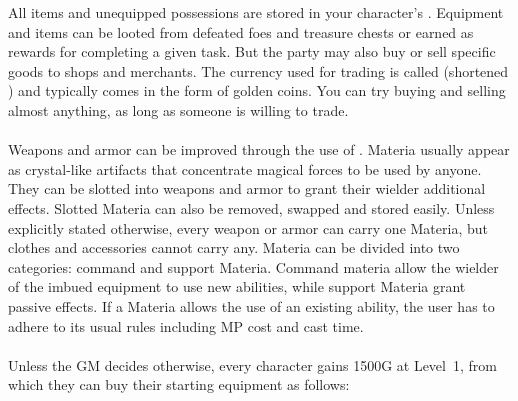 %
\vfill
%
All items and unequipped possessions are stored in your character's .
Equipment and items can be looted from defeated foes and treasure chests or earned as rewards for completing a given task. 
But the party may also buy or sell specific goods to shops and merchants. 
The currency used for trading is called  (shortened ) and typically comes in the form of golden coins.
You can try buying and selling almost anything, as long as someone is willing to trade.
%
\newpage
%
%
\vfill
%
\\\\
%
Weapons and armor can be improved through the use of .
Materia usually appear as crystal-like artifacts that concentrate magical forces to be used by anyone.
They can be slotted into weapons and armor to grant their wielder additional effects.
Slotted Materia can also be removed, swapped and stored easily. 
Unless explicitly stated otherwise, every weapon or armor can carry one Materia, but clothes and accessories cannot carry any.
Materia can be divided into two categories: command and support Materia.
Command materia allow the wielder of the imbued equipment to use new abilities, while support Materia grant passive effects.
If a Materia allows the use of an existing ability, the user has to adhere to its usual rules including MP cost and cast time.
%
\vfill
%
\\\\
%
Unless the GM decides otherwise, every character gains 1500G at Level~1, from which they can buy their starting equipment as follows:
\ofrow
{}
